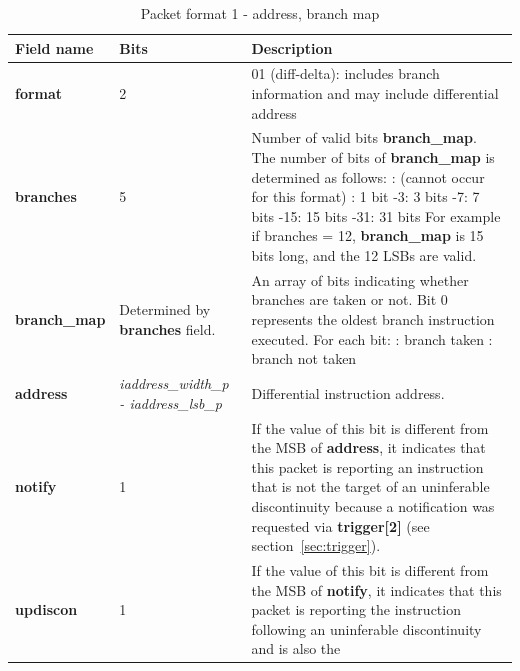 \begin{table}[htp]
  \centering
  \caption{Packet format 1 - address, branch map}
  \label{tab:te_inst1-addr-map}
  \begin{tabulary}{\textwidth}{|l|p{35mm}|p{90mm}|}
    \hline
    {\bf Field name} & {\bf Bits} & {\bf Description} \\
    \hline
    \textbf{format}	& 2	& 01 (diff-delta): includes branch information and may include differential address\\
    \hline
    \textbf{branches} & 5 & Number of valid bits \textbf{branch\_map}. The number of bits of \textbf{branch\_map} is determined as follows: :	   (cannot occur for this format) :	   1 bit -3:   3 bits -7:   7 bits -15:  15 bits -31: 31 bits \newline
    For example if branches = 12, \textbf{branch\_map} is 15 bits long, and the 12 LSBs are valid. \\
    \hline
    \textbf{branch\_map} & Determined by \newline 
                 \textbf{branches} field. & 
                 An array of bits indicating whether branches are taken or not.\newline
    Bit 0 represents the oldest branch instruction executed.   For each bit: : branch taken : branch not taken \\
    \hline
    \textbf{address}	& \textit {iaddress\_width\_p - iaddress\_lsb\_p} & 
                Differential instruction address.\\
    \hline
    \textbf{notify}	& 1 & 
                If the value of this bit is different from the MSB of \textbf{address}, it indicates that this 
                packet is reporting an instruction that is not the target of an uninferable discontinuity 
                because a notification was requested via \textbf{trigger[2]} (see section~\ref{sec:trigger}). \\
    \hline
    \textbf{updiscon}	& 1 & 
                If the value of this bit is different from the MSB of \textbf{notify}, it indicates that this 
                packet is reporting the instruction following an uninferable discontinuity and is also the 

\end{tabulary}
\end{table}
